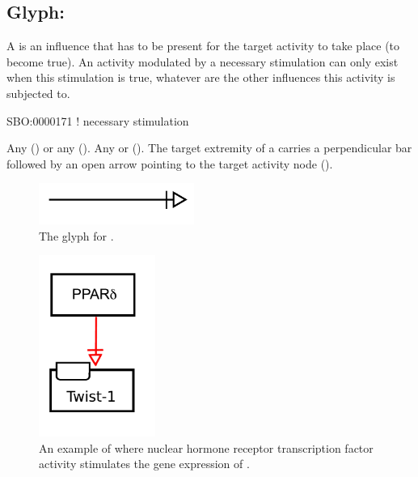 \subsection{Glyph: }
\label{sec:af:trigger}
A  is an influence that has to be present for the target activity to take place (to become true).  An activity modulated by a necessary stimulation can only exist when this stimulation is true, whatever are the other influences this activity is subjected to.

\begin{glyphDescription}

\glyphSboTerm SBO:0000171 ! necessary stimulation

 \glyphOrigin Any  () or any  ().
 \glyphTarget Any  or  ().
 \glyphEndPoint The target extremity of a  carries a perpendicular bar followed by an open arrow pointing to the target activity node ().

\end{glyphDescription}

\begin{figure}[H]
  \centering
  \includegraphics[width = 2in]{images/necessaryStimulation}
  \caption{The \AF glyph for .}
  \label{fig:af:trigger}
\end{figure}

\begin{figure}[H]
  \centering
  \includegraphics[width = 1.5in]{examples/ex-necessaryStimulation}
  \caption{An example of  where nuclear hormone receptor  transcription factor activity stimulates the gene expression of . }
  \label{fig:af:ex-NS}
\end{figure}
